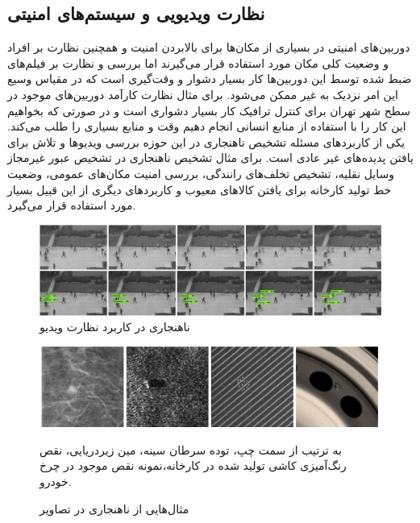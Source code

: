\documentclass[12pt,a4paper]{report}
\begin{document}
\subsection{نظارت ویدیویی و سیستم‌های امنیتی}
دوربین‌های امنیتی در بسیاری از مکان‌ها برای بالابردن امنیت و همچنین نظارت بر افراد و وضعیت کلی مکان مورد استفاده قرار می‌گیرند اما بررسی و نظارت بر فیلم‌های ضبط شده توسط این دوربین‌ها کار بسیار دشوار و وقت‌گیری است که در مقیاس وسیع این امر نزدیک به غیر ممکن می‌شود. برای مثال نظارت کار‌آمد دوربین‌های موجود در سطح شهر تهران برای کنترل ترافیک کار بسیار دشواری است و در صورتی که بخواهیم این کار را با استفاده از منابع انسانی انجام دهیم وقت و منابع بسیاری را طلب می‌کند. یکی از کاربرد‌های مسئله تشخیص ناهنجاری در این حوزه بررسی ویدیو‌ها و تلاش برای یافتن پدیده‌های غیر عادی است. برای مثال تشخیص ناهنجاری در تشخیص عبور غیرمجاز وسایل نقلیه، تشخیص تخلف‌های رانندگی، بررسی امنیت مکان‌های عمومی، وضعیت خط تولید کارخانه برای یافتن کالاهای معیوب و کاربرد‌های دیگری از این قبیل بسیار مورد استفاده قرار می‌گیرد.
\begin{figure}[!hp]
	\begin{center}
		\includegraphics[width=\linewidth]{./images/figures/walkway-anomaly.png}
		\caption{ناهنجاری در کاربرد نظارت ویدیو~\cite{10.1016/j.compeleceng.2019.02.017}}
		\label{fig:walkway-anomaly}
	\end{center}
\end{figure}

\begin{figure}[!hp]
	\begin{center}
		\includegraphics[width=\linewidth]{./images/figures/image-anomaly-examples-1.png}
		\caption*{به ترتیب از سمت چپ، توده سرطان سینه، مین زیر‌دریایی، نقص رنگ‌آمیزی کاشی تولید شده در کارخانه،نمونه نقص موجود در چرخ خودرو.}
		\caption{
		مثال‌هایی از ناهنجاری در تصاویر
		\cite{T.Ehret}
		}		
		\label{fig:anomaly-example-1}
		\centering
	\end{center}
\end{figure}
\end{document}
